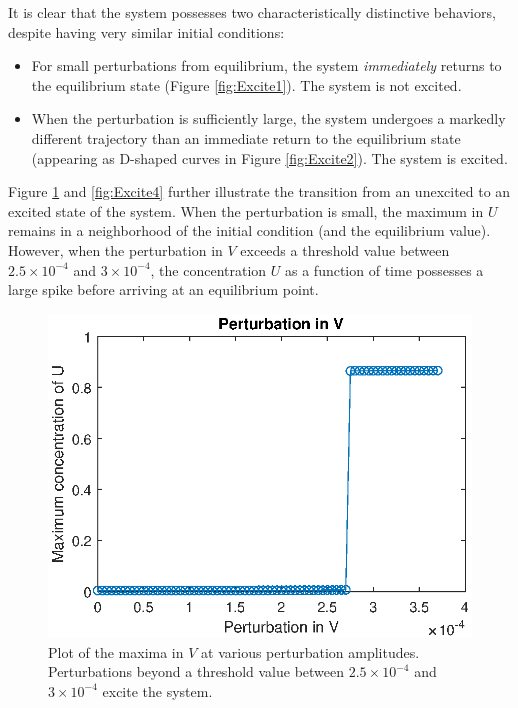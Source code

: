 \documentclass[twocolumn,amsmath,amssymb,aps]{revtex4}
\begin{document}
It is clear that the system possesses two characteristically distinctive behaviors, despite having very similar initial conditions:
\begin{itemize}
	\item For small perturbations from equilibrium, the system \textit{immediately} returns to the equilibrium state (Figure \ref{fig:Excite1}). The system is not excited.
	\item When the perturbation is sufficiently large, the system undergoes a markedly different trajectory than an immediate return to the equilibrium state (appearing as D-shaped curves in Figure \ref{fig:Excite2}). The system is excited.
\end{itemize}


Figure \ref{fig:Excite3} and \ref{fig:Excite4} further illustrate the transition from an unexcited to an excited state of the system. When the perturbation is small, the maximum in $U$ remains in a neighborhood of the initial condition (and the equilibrium value). However, when the perturbation in $V$ exceeds a threshold value between $2.5 \times 10^{-4}$ and $3 \times 10^{-4}$, the concentration $U$ as a function of time possesses a large spike before arriving at an equilibrium point. 


\begin{figure}[!htb]
	\centering
	\includegraphics[scale=0.6]{excite_2.eps}
	\caption{Plot of the maxima in $V$ at various perturbation amplitudes. Perturbations beyond a threshold value between $2.5\times 10^{-4}$ and $3\times 10^{-4}$ excite the system.}
	\label{fig:Excite3}
\end{figure}
\end{document}
